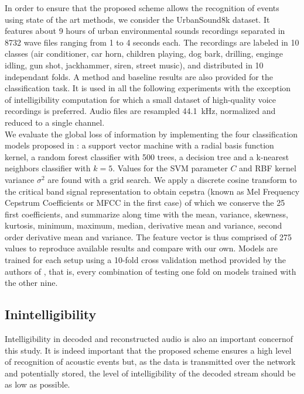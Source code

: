 \documentclass[final,3p,times,twocolumn]{elsarticle}
\begin{document}
In order to ensure that the proposed scheme allows the recognition of events using state of the art methods, we consider the UrbanSound8k dataset\cite{salamon2014}. It features about 9 hours of urban environmental sounds recordings separated in 8732 wave files ranging from 1 to 4 seconds each. The recordings are labeled in 10 classes (air conditioner, car horn, children playing, dog bark, drilling, enginge idling, gun shot, jackhammer, siren, street music), and distributed in 10 independant folds. A method and baseline results are also provided for the classification task. It is used in all the following experiments with the exception of intelligibility computation for which a small dataset of high-quality voice recordings is preferred. Audio files are resampled 44.1~kHz, normalized and reduced to a single channel.\\

We evaluate the global loss of information by implementing the four classification models proposed in \cite{salamon2014}: a support vector machine with a radial basis function kernel, a random forest classifier with 500 trees, a decision tree and a k-nearest neighbors classifier with $k = 5$. Values for the SVM parameter $C$ and RBF kernel variance $\sigma^2$ are found with a grid search. We apply a discrete cosine transform to the critical band signal representation to obtain cepstra (known as Mel Frequency Cepstrum Coefficients or MFCC in the first case) of which we conserve the 25 first coefficients, and summarize along time with the mean, variance, skewness, kurtosis, minimum, maximum, median, derivative mean and variance, second order derivative mean and variance. The feature vector is thus comprised of 275 values to reproduce available results and compare with our own. Models are trained for each setup using a 10-fold cross validation method provided by the authors of \cite{salamon2014}, that is, every combination of testing one fold on models trained with the other nine.

\subsection{Inintelligibility} \label{sec:inintelligibility}

Intelligibility in decoded and reconstructed audio is also an important concernof this study. It is indeed important that the proposed scheme ensures a high level of recognition of acoustic events but, as the data is transmitted over the network and potentially stored, the level of intelligibility of the decoded stream should be as low as possible.
\end{document}
